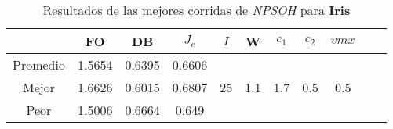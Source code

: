 \begin{table}[h!]
\footnotesize
\begin{center}
\begin{tabular}{|c|c|c|c|c|c|c|c|c|c|c|}
\hline
& {\bf FO} & {\bf DB}& $J_e$ & $I$ & W & $c_1$ & $c_2$ & $vmx$ \\
\hline
\hline
Promedio   & 1.5654 & 0.6395  & 0.6606 &  &  &  &  & \\
\cline{1-4}
Mejor & 1.6626 & 0.6015  & 0.6807 & 25 & 1.1 & 1.7 & 0.5 & 0.5\\
\cline{1-4}
Peor & 1.5006 & 0.6664  & 0.649 &  &  &  &  & \\\hline
\end{tabular}
\caption{Resultados de las mejores corridas de \emph{NPSOH} para {\bf Iris}}
\label{tb:pmppsohibcsv}
\end{center}
\end{table}
